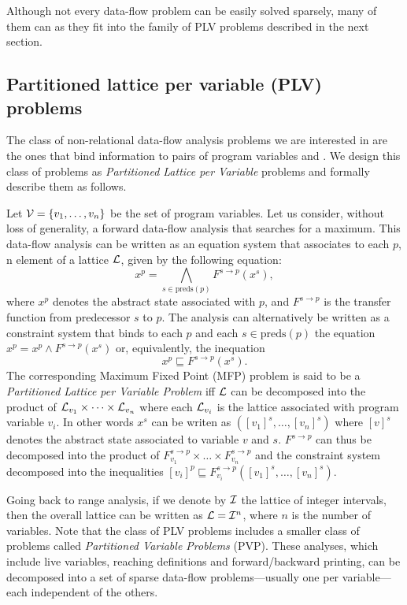 {Although not every data-flow problem can be easily solved sparsely, many of 
them can as they fit into the family of PLV problems described in the next 
section.

\subsection{Partitioned lattice per variable (PLV) problems}
\label{sec:ssi:pereira:pvpPvl}

The class of non-relational data-flow analysis problems we are interested in are the ones that bind information to pairs of program variables and \progpoints.
We design this class of problems as \emph{Partitioned Lattice per 
Variable} problems 
and formally describe them as follows.

\begin{definition}[PLV]
Let ${\cal V}=\{v_1,\dots,v_n\}$ be the set of program variables.
Let us consider, without loss of generality, a forward data-flow analysis that 
searches for a maximum.
This data-flow analysis can be written as an equation system that associates to 
each \progpoint $p$, n element of a lattice ${\cal L}$, given by the following 
equation:
$$x^p = \bigwedge_{s \in \textrm{preds}(p)} F^{s\to p}(x^s),$$
where $x^p$ denotes the abstract state associated  with \progpoint $p$, and
$F^{s\to p}$ is the transfer function from predecessor $s$ to $p$.
The analysis can alternatively be written as a constraint system that binds to 
each \progpoint $p$ and each $s\in \textrm{preds}(p)$ the equation $x^p = x^p 
\wedge  F^{s\to p}(x^s)$ or, equivalently, the inequation $$x^p \sqsubseteq  
F^{s\to p}(x^s).$$
The corresponding Maximum Fixed Point (MFP) problem is said to be 
a \emph{Partitioned Lattice per Variable Problem} iff $\cal L$ can be 
decomposed into the product of ${\cal L}_{v_1}\times \dots \times {\cal 
L}_{v_n}$ where each ${\cal L}_{v_i}$ is the lattice associated with program 
variable $v_i$. In other words $x^s$ can be writen as $([v_1]^s,\dots,[v_n]^s)$ 
where $[v]^s$ denotes the abstract state associated to variable $v$ and 
\progpoint $s$. $F^{s\to p}$ can thus be decomposed into the product of 
$F^{s\to p}_{v_1}\times \dots\times F^{s\to p}_{v_n}$ and the constraint system 
decomposed into the inequalities $[v_i]^p\sqsubseteq  F^{s\to 
p}_{v_i}([v_1]^s,\dots,[v_n]^s)$.
\end{definition}

Going back to range analysis, if we denote by $\cal I$ the lattice of integer intervals, then the overall lattice can be written as ${\cal L}={\cal I}^n$, where $n$ is the number of variables.
%
Note that the class of PLV problems includes a smaller class of problems called 
{\em Partitioned Variable Problems} (PVP).
These analyses, which include live variables, reaching definitions and 
forward/backward printing, can be decomposed into a set of sparse data-flow 
problems---usually one per variable---each independent of the others.

}
